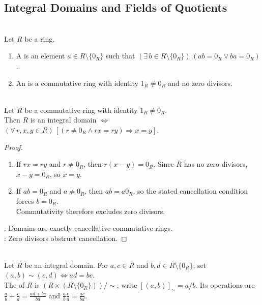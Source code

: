 \subsection{Integral Domains and Fields of Quotients}

\begin{definition} \label{def:zero-divisor-integral-domain} \\
Let $R$ be a ring.
\begin{enumerate}[label=(\roman*)]
\setlength{\itemsep}{0pt}
\item A  is an element $a\in R\setminus\{0_R\}$ such that $(\exists\,b\in R\setminus\{0_R\})\,(ab=0_R\lor ba=0_R)$.
\item An  is a commutative ring with identity $1_R\neq0_R$ and no zero divisors.
\end{enumerate}
\end{definition}

\begin{proposition} \label{prop:integral-domain-cancellation} \\
Let $R$ be a commutative ring with identity $1_R\neq0_R$.\\
Then $R$ is an integral domain $\iff$ $(\forall\,r,x,y\in R)\,[(r\neq0_R\land rx=ry)\Rightarrow x=y]$.
\begin{proof}
\begin{enumerate}[label=\roman*.]
\setlength{\itemsep}{0pt}
\item[$(\Rightarrow)$] If $rx=ry$ and $r\neq0_R$, then $r(x-y)=0_R$. Since $R$ has no zero divisors, $x-y=0_R$, so $x=y$.
\item[$(\Leftarrow)$] If $ab=0_R$ and $a\neq0_R$, then $ab=a0_R$, so the stated cancellation condition forces $b=0_R$.\\
Commutativity therefore excludes zero divisors.
\end{enumerate}
: Domains are exactly cancellative commutative rings.\\
: Zero divisors obstruct cancellation.
\end{proof}
\end{proposition}

\begin{definition} \label{def:field-of-quotients} \\
Let $R$ be an integral domain. For $a,c\in R$ and $b,d\in R\setminus\{0_R\}$, set $(a,b)\sim(c,d)\Longleftrightarrow ad=bc$.\\
The  of $R$ is $(R\times(R\setminus\{0_R\}))/\sim$; write $[(a,b)]_{\sim}=a/b$. Its operations are $\frac{a}{b}+\frac{c}{d}=\frac{ad+bc}{bd}$ and $\frac{a}{b}\frac{c}{d}=\frac{ac}{bd}$.
\end{definition}

